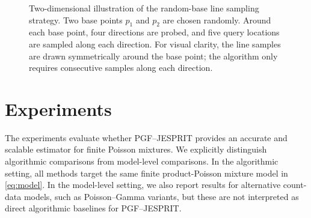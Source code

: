 \documentclass[sigconf,natbib=true,anonymous=true,review=true]{acmart}
\begin{document}
\begin{figure}[t]
\caption{Two-dimensional illustration of the random-base line sampling strategy. Two base points $p_1$ and $p_2$ are chosen randomly. Around each base point, four directions are probed, and five query locations are sampled along each direction. For visual clarity, the line samples are drawn symmetrically around the base point; the algorithm only requires consecutive samples along each direction.}
\label{fig:2d_sampling_scheme}
\end{figure}

\section{Experiments}
\label{sec:experiments}

The experiments evaluate whether PGF--JESPRIT provides an accurate and scalable estimator for finite Poisson mixtures. 
We explicitly distinguish algorithmic comparisons from model-level comparisons. 
In the algorithmic setting, all methods target the same finite product-Poisson mixture model in \eqref{eq:model}. 
In the model-level setting, we also report results for alternative count-data models, such as Poisson--Gamma variants, but these are not interpreted as direct algorithmic baselines for PGF--JESPRIT.
\end{document}
